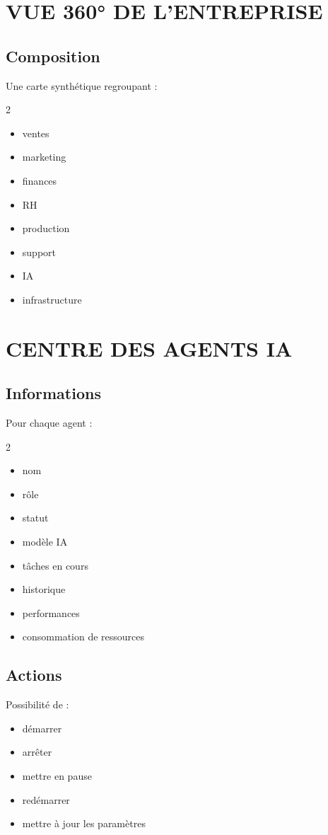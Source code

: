 \documentclass[12pt,a4paper,oneside]{book}
\begin{document}
\chapter{VUE 360° DE L'ENTREPRISE}

\section{Composition}
Une carte synthétique regroupant :
\begin{multicols}{2}
\begin{itemize}
\item ventes
\item marketing
\item finances
\item RH
\item production
\item support
\item IA
\item infrastructure
\end{itemize}
\end{multicols}

\chapter{CENTRE DES AGENTS IA}

\section{Informations}
Pour chaque agent :
\begin{multicols}{2}
\begin{itemize}
\item nom
\item rôle
\item statut
\item modèle IA
\item tâches en cours
\item historique
\item performances
\item consommation de ressources
\end{itemize}
\end{multicols}

\section{Actions}
Possibilité de :
\begin{itemize}
\item démarrer
\item arrêter
\item mettre en pause
\item redémarrer
\item mettre à jour les paramètres
\end{itemize}
\end{document}
